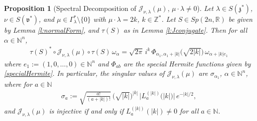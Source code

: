 \documentclass[11pt]{amsart}
\theoremstyle{plain}
\newtheorem{proposition}[theorem]{Proposition}
\theoremstyle{definition}
\theoremstyle{remark}
\numberwithin{equation}{section}
\def\fz{\mathfrak{z}}
\def\fv{\mathfrak{v}}
\def\cJ{\mathcal{J}}
\def\mz{\setminus\{0\}}
\def\R{{\mathbb R}}%
\def\N{{\mathbb N}}%
\def\Z{{\mathbb Z}}%
\numberwithin{equation}{section}
\begin{document}
\begin{proposition}[Spectral Decomposition of $\cJ_{\nu, \lambda}(\mu)$, $\mu\cdot\lambda\neq 0$]\label{specDecompShift}
Let $\lambda\in S(\fz^*)$, $\nu\in S(\fv^*)$, and $\mu\in \Gamma_\lambda^*\mz$ with $\mu\cdot\lambda=2k$, $k\in \Z^*$. Let $S\in Sp(2n, \R)$ be given by Lemma \ref{l:normalForm}, and $\tau(S)$ as in Lemma \ref{l:Jconjugate}. Then for all $\alpha\in \N^n$,
\begin{align}\label{e:shift}
	\tau(S)^*\circ\cJ_{\nu, \lambda}(\mu)\circ\tau(S)\,\omega_\alpha=\sqrt{2\pi}\, i^k\, \Phi_{\alpha_1, \alpha_1+|k|}\big(\sqrt{2|k|}\big)\,\omega_{\alpha+|k|e_1}
\end{align}
where $e_1:=(1, 0, \ldots, 0)\in \N^n$ and $\Phi_{ab}$ are the special Hermite functions given by \eqref{specialHermite}. In particular, the singular values of $\cJ_{\nu, \lambda}(\mu)$ are $\sigma_{\alpha_1}$, $\alpha\in \N^n$, where for $a\in \N$
\begin{align*}
	\sigma_a:=\sqrt{\tfrac{a!}{(a+|k|)!}}\,\big(\sqrt{|k|}\big)^{|k|}\,\big|L_a^{(|k|)}\big(|k|\big)\big|\, e^{-|k|/2},
\end{align*}
and $\cJ_{\nu, \lambda}(\mu)$ is injective if and only if $L_a^{(|k|)}(|k|)\neq 0$ for all $a\in \N$.
\end{proposition}
\end{document}
